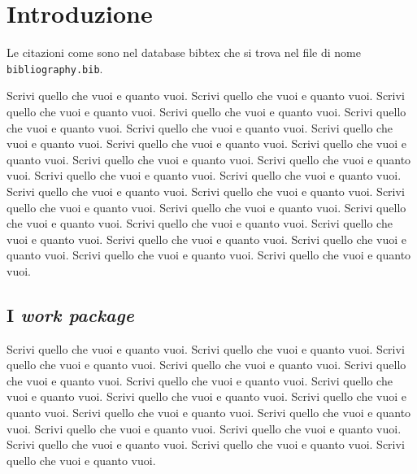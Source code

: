 \documentclass[10pt,a4paper,twoside]{memoir} %
\begin{document}
\mainmatter %


\pagestyle{Ruled} %


\chapter{Introduzione}
Le citazioni come \cite{10.1109/SP.2008.11} sono nel database bibtex che  si trova nel file di nome \texttt{bibliography.bib}.


Scrivi quello che vuoi e quanto vuoi. Scrivi quello che vuoi e quanto vuoi.
Scrivi quello che vuoi e quanto vuoi. Scrivi quello che vuoi e quanto vuoi.
Scrivi quello che vuoi e quanto vuoi. Scrivi quello che vuoi e quanto vuoi.
Scrivi quello che vuoi e quanto vuoi. Scrivi quello che vuoi e quanto vuoi.
Scrivi quello che vuoi e quanto vuoi. Scrivi quello che vuoi e quanto vuoi.
Scrivi quello che vuoi e quanto vuoi. Scrivi quello che vuoi e quanto vuoi.
Scrivi quello che vuoi e quanto vuoi. Scrivi quello che vuoi e quanto vuoi.
Scrivi quello che vuoi e quanto vuoi. Scrivi quello che vuoi e quanto vuoi.
Scrivi quello che vuoi e quanto vuoi. Scrivi quello che vuoi e quanto vuoi.
Scrivi quello che vuoi e quanto vuoi. Scrivi quello che vuoi e quanto vuoi.
Scrivi quello che vuoi e quanto vuoi. Scrivi quello che vuoi e quanto vuoi.
Scrivi quello che vuoi e quanto vuoi. Scrivi quello che vuoi e quanto vuoi.


\section{I \textit{work package}}
\label{subesection:I work package}
Scrivi quello che vuoi e quanto vuoi. Scrivi quello che vuoi e quanto vuoi.
Scrivi quello che vuoi e quanto vuoi. Scrivi quello che vuoi e quanto vuoi.
Scrivi quello che vuoi e quanto vuoi. Scrivi quello che vuoi e quanto vuoi.
Scrivi quello che vuoi e quanto vuoi. Scrivi quello che vuoi e quanto vuoi.
Scrivi quello che vuoi e quanto vuoi. Scrivi quello che vuoi e quanto vuoi.
Scrivi quello che vuoi e quanto vuoi. Scrivi quello che vuoi e quanto vuoi.
Scrivi quello che vuoi e quanto vuoi. Scrivi quello che vuoi e quanto vuoi.
Scrivi quello che vuoi e quanto vuoi. Scrivi quello che vuoi e quanto vuoi.

\end{document}
